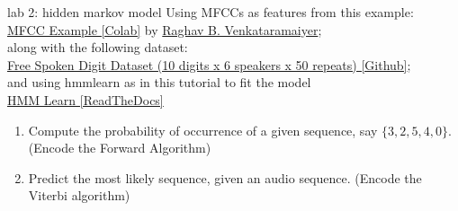 \documentclass[aspectratio=169,xcolor={dvipsnames,svgnames}]{beamer}
\begin{document}
\begin{frame}[label=lab-2]{lab 2: hidden markov model}
Using MFCCs as features from this example: \\[0pt]
\href{https://colab.research.google.com/drive/1pkopM-0bSoxH1WDwq94bFSBxXpkHrjI3?usp=sharing}{MFCC Example [Colab]​} by \href{https://github.com/bvraghav}{Raghav B. Venkataramaiyer};\\[0pt]
along with the following dataset: \\[0pt]
\href{https://github.com/Jakobovski/free-spoken-digit-dataset}{Free Spoken Digit Dataset (10 digits x 6 speakers x 50
repeats) [Github]​}; \\[0pt]
and using hmmlearn as in this tutorial to fit the
model \\[0pt]
\href{https://hmmlearn.readthedocs.io/en/latest/tutorial.html}{HMM Learn [ReadTheDocs]​}

\begin{enumerate}
\item Compute the probability of occurrence of a given
sequence, say \(\{3,2,5,4,0\}\). (Encode the Forward
Algorithm)
\item Predict the most likely sequence, given an audio
sequence. (Encode the Viterbi algorithm)
\end{enumerate}
\end{frame}
\end{document}
